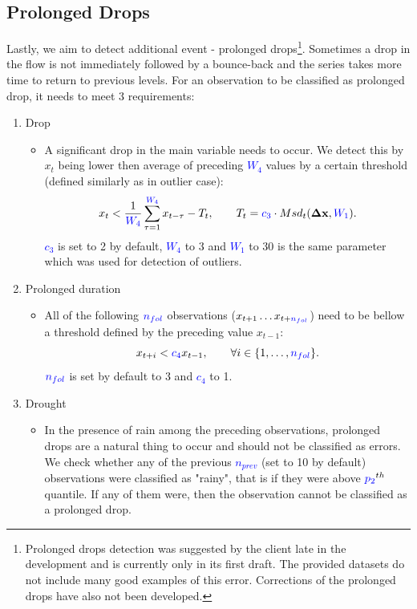 \documentclass[12pt,a4paper]{article}
\begin{document}
\subsection{Prolonged Drops}
Lastly, we aim to detect additional event - prolonged drops\footnote{Prolonged drops detection was suggested by the client late in the development and is currently only in its first draft. The provided datasets do not include many good examples of this error. Corrections of the prolonged drops have also not been developed.}. Sometimes a drop in the flow is not immediately followed by a bounce-back and the series takes more time to return to previous levels.
For an observation to be classified as prolonged drop, it needs to meet 3 requirements:
\begin{enumerate}
    \item Drop
    \begin{itemize}
        \item A significant drop in the main variable needs to occur. We detect this by $x_t$ being lower then average of preceding \textcolor{blue}{$W_4$} values by a certain threshold (defined similarly as in outlier case):
        \[
         x_t < \frac{1}{\textcolor{blue}{W_4}}\sum_{\tau=1}^{\textcolor{blue}{W_4}}x_{t-\tau} -T_t, \qquad T_t = \textcolor{blue}{c_3} \cdot Msd_t(\mathbf{\Delta x},\textcolor{blue}{W_1}).
        \]
        \textcolor{blue}{$c_3$} is set to 2 by default, \textcolor{blue}{$W_4$} to 3 and \textcolor{blue}{$W_1$} to 30 is the same parameter which was used for detection of outliers.
    \end{itemize}
    \item Prolonged duration
    \begin{itemize}
        \item All of the following $\textcolor{blue}{n_{fol}}$ observations ($x_{t+1}\dots x_{t+\textcolor{blue}{n_{fol}}}$) need to be bellow a threshold defined by the preceding value  $x_{t-1}$:
        \[
        x_{t+i} < \textcolor{blue}{c_4} x_{t-1}, \qquad \forall i \in \{1,\dots, \textcolor{blue}{n_{fol}}\}.
        \]
        $\textcolor{blue}{n_{fol}}$ is set by default to 3 and \textcolor{blue}{$c_4$} to 1.
    \end{itemize}
    \item Drought
    \begin{itemize}
        \item In the presence of rain among the preceding observations, prolonged drops are a natural thing to occur and should not be classified as errors. We check whether any of the previous \textcolor{blue}{$n_{prev}$} (set to 10 by default) observations were classified as "rainy", that is if they were above $\textcolor{blue}{p_2}^{th}$ quantile. If any of them were, then the observation cannot be classified as a prolonged drop.
    \end{itemize}
\end{enumerate}
\end{document}

